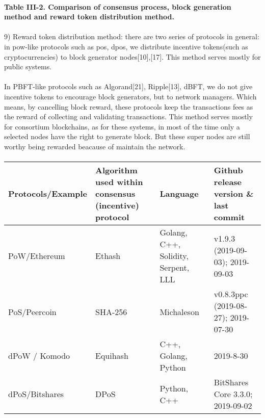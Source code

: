 \documentclass[doublespacing]{bmcart}
\begin{document}
\begin{CJK*}{UTF8}{gbsn}
\paragraph{Table III-2. Comparison of consensus process, block generation method and reward token distribution method.}

\paragraph{}
9) Reward token distribution method: there are two series of protocols in general: in pow-like protocols such as pos, dpos, we distribute incentive tokens(such as cryptocurrencies) to block generator nodes[10],[17]. This method serves mostly for public systems. 
\paragraph{}
In PBFT-like protocols such as Algorand[21], Ripple[13], dBFT, we do not give incentive tokens to encourage block generators, but to network managers. Which means, by cancelling block reward, these protocols keep the transactions fees as the reward of collecting and validating transactions. This method serves mostly for consortium blockchains, as for these systems, in most of the time only a selected nodes have the right to generate block. But these super nodes are still worthy being rewarded beacause of maintain the network.
\paragraph{}
\begin{tabular}{p{2cm}p{3cm}p{3cm}p{3cm}}
\hline
Protocols/E\-xample 
& Algorithm used within consensus (incentive) protocol 
& Language 
& Github release version \& last commit \\ \hline

PoW/Ethe\-reum  
& Ethash & Golang, C++, Solidity, Serpent, LLL & 	v1.9.3 (2019-09-03); 2019-09-03 \\ \hline

PoS/Peercoin & SHA-256 & Michaleson & 	v0.8.3ppc (2019-08-27); 2019-07-30 \\ \hline

dPoW / Komodo & Equihash & C++, Golang, Python & 2019-8-30 \\ \hline

dPoS/\newline Bitshares  & DPoS & Python, C++ & BitShares Core 3.3.0; 2019-09-02  \\ \hline


\end{tabular}
\end{CJK*}
\end{document}
